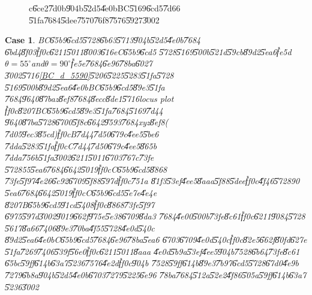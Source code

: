 \documentclass[12pt,a4paper]{article}
\newtheorem{case}[theorem]{Case}
\begin{document}
\begin{figure}[th]
\caption{c\U{6ce2}\U{7d0b}\U{904b}\U{52d5}\U{4e0b}BC\U{5169}\U{6cd5}\U{7d66}%
\U{51fa}\U{7684}\U{5dee}\U{7570}\U{76f8}\U{7576}\U{5927}\U{3002}}
\label{BC_c_drift_fig}
\begin{center}

\end{center}
\end{figure}

\begin{case}
BC\U{65b9}\U{6cd5}\U{5728}\U{6b63}\U{5713}\U{904b}\U{52d5}\U{4e0b}\U{7684}%
\U{6bd4}\U{8f03}\U{ff0c}\U{6211}\U{5011}\U{8003}\U{616e}C\U{65b9}\U{6cd5}%
\U{5728}\U{5169}\U{500b}\U{521d}\U{59cb}\U{89d2}\U{5ea6}\U{fe5d}$\theta
=55^{\circ }$and$\theta =90^{\circ }$\U{fe5e}\U{7684}\U{6e96}\U{78ba}\U{6027}%
\U{3002}\U{5716}\ref{BC_d_5590}\U{5206}\U{5225}\U{5283}\U{51fa}\U{5728}%
\U{5169}\U{500b}\U{89d2}\U{5ea6}\U{4e0b}BC\U{65b9}\U{6cd5}\U{89e3}\U{51fa}%
\U{7684}\U{9640}\U{87ba}z\U{8ef8}\U{7684}\U{8ecc}\U{8de1}\U{5716}locus plot%
\U{ff0c}\U{8207}BC\U{65b9}\U{6cd5}\U{89e3}\U{51fa}\U{7684}\U{5169}\U{7d44}%
\U{9640}\U{87ba}\U{5728}\U{6700}\U{5f8c}\U{6642}\U{9593}\U{7684}xyz\U{8ef8}(%
\U{7d05}\U{9ec3}\U{85cd})\U{ff0c}B\U{7d44}\U{7d50}\U{679c}\U{4ee5}\U{5be6}%
\U{7dda}\U{5283}\U{51fa}\U{ff0c}C\U{7d44}\U{7d50}\U{679c}\U{4ee5}\U{865b}%
\U{7dda}\U{756b}\U{51fa}\U{3002}\U{6211}\U{5011}\U{6703}\U{767c}\U{73fe}%
\U{5728}55\U{5ea6}\U{7684}\U{6642}\U{5019}\U{ff0c}C\U{65b9}\U{6cd5}\U{8868}%
\U{73fe}\U{5f97}\U{4e26}\U{6c92}\U{6709}\U{5f88}\U{597d}\U{ff0c}\U{751a}%
\U{81f3}\U{53ef}\U{4ee5}\U{8aaa}\U{5f88}\U{5dee}\U{ff0c}\U{4f46}\U{5728}90%
\U{5ea6}\U{7684}\U{6642}\U{5019}\U{ff0c}C\U{65b9}\U{6cd5}\U{5e7e}\U{4e4e}%
\U{8207}B\U{65b9}\U{6cd5}\U{91cd}\U{5408}\U{ff0c}\U{8868}\U{73fe}\U{5f97}%
\U{6975}\U{597d}\U{3002}\U{9019}\U{662f}\U{975e}\U{5e38}\U{6709}\U{8da3}%
\U{7684}\U{4e00}\U{500b}\U{73fe}\U{8c61}\U{ff0c}\U{6211}\U{9084}\U{5728}%
\U{5617}\U{8a66}\U{7406}\U{89e3}\U{70ba}\U{4f55}\U{5728}\U{4e0d}\U{540c}%
\U{89d2}\U{5ea6}\U{4e0b}C\U{65b9}\U{6cd5}\U{7684}\U{6e96}\U{78ba}\U{5ea6}%
\U{6703}\U{6709}\U{4e0d}\U{540c}\U{ff0c}\U{82e5}\U{662f}\U{80fd}\U{627e}%
\U{51fa}\U{7269}\U{7406}\U{539f}\U{56e0}\U{ff0c}\U{6211}\U{5011}\U{8aaa}%
\U{4e0d}\U{5b9a}\U{53ef}\U{4ee5}\U{904b}\U{7528}\U{6b64}\U{73fe}\U{8c61}%
\U{65bc}\U{59ff}\U{614b}\U{63a7}\U{5236}\U{7576}\U{4e2d}\U{ff0c}\U{904b}%
\U{7528}\U{59ff}\U{614b}\U{89e3}\U{7b97}\U{6cd5}\U{5728}\U{67d0}\U{4e9b}%
\U{7279}\U{6b8a}\U{904b}\U{52d5}\U{4e0b}\U{6703}\U{7279}\U{5225}\U{6e96}%
\U{78ba}\U{7684}\U{512a}\U{52e2}\U{4f86}\U{505a}\U{59ff}\U{614b}\U{63a7}%
\U{5236}\U{3002}
\end{case}
\end{document}
